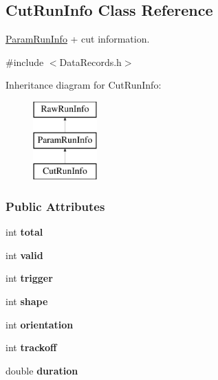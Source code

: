 \hypertarget{classCutRunInfo}{
\subsection{CutRunInfo Class Reference}
\label{classCutRunInfo}
}


\hyperlink{classParamRunInfo}{ParamRunInfo} + cut information.  




{\ttfamily \#include $<$DataRecords.h$>$}

Inheritance diagram for CutRunInfo:\begin{figure}[H]
\begin{center}
\leavevmode
\includegraphics[height=3.000000cm]{classCutRunInfo}
\end{center}
\end{figure}
\subsubsection*{Public Attributes}
\begin{DoxyCompactItemize}
\item 
\hypertarget{classCutRunInfo_a711281ce18c77ebd12a7910ab1841b7c}{
int {\bfseries total}}
\label{classCutRunInfo_a711281ce18c77ebd12a7910ab1841b7c}

\item 
\hypertarget{classCutRunInfo_acfadf61bb4cf234c443d87708774fe81}{
int {\bfseries valid}}
\label{classCutRunInfo_acfadf61bb4cf234c443d87708774fe81}

\item 
\hypertarget{classCutRunInfo_aa9d2bf43e7f23a1650de5c7ffb20e79b}{
int {\bfseries trigger}}
\label{classCutRunInfo_aa9d2bf43e7f23a1650de5c7ffb20e79b}

\item 
\hypertarget{classCutRunInfo_a49356d438070918c81c80698850161bf}{
int {\bfseries shape}}
\label{classCutRunInfo_a49356d438070918c81c80698850161bf}

\item 
\hypertarget{classCutRunInfo_a349308b08b4041bdfaea2a06d82ab86e}{
int {\bfseries orientation}}
\label{classCutRunInfo_a349308b08b4041bdfaea2a06d82ab86e}

\item 
\hypertarget{classCutRunInfo_a69c3b28457dcb2ce78a76820f9137fbd}{
int {\bfseries trackoff}}
\label{classCutRunInfo_a69c3b28457dcb2ce78a76820f9137fbd}

\item 
\hypertarget{classCutRunInfo_a86dc52ebd1a40a23b855fce85a0329b5}{
double {\bfseries duration}}
\label{classCutRunInfo_a86dc52ebd1a40a23b855fce85a0329b5}

\end{DoxyCompactItemize}


